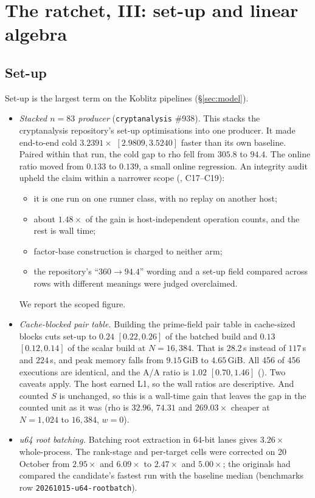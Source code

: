 \section{The ratchet, III: set-up and linear algebra}\label{sec:setup}

\subsection{Set-up}

Set-up is the largest term on the Koblitz pipelines (\S\ref{sec:model}).
\begin{itemize}
\item \emph{Stacked $n=83$ producer} (\texttt{cryptanalysis} \#938). This
  stacks the cryptanalysis repository's set-up optimisations into one
  producer. It made end-to-end cold $3.2391\times$ $[2.9809,3.5240]$
  faster than its own baseline. Paired within that run, the cold gap to
  rho fell from $305.8$ to $94.4$. The online ratio moved from $0.133$ to
  $0.139$, a small online regression. An integrity audit upheld the claim
  within a narrower scope (,
  C17--C19):
  \begin{itemize}
  \item it is one run on one runner class, with no replay on another host;
  \item about $1.48\times$ of the gain is host-independent operation
    counts, and the rest is wall time;
  \item factor-base construction is charged to neither arm;
  \item the repository's ``$360\to94.4$'' wording and a set-up field
    compared across rows with different meanings were judged
    overclaimed.
  \end{itemize}
  We report the scoped figure.
\item \emph{Cache-blocked pair table.} Building the prime-field pair table
  in cache-sized blocks cuts set-up to $0.24$ $[0.22,0.26]$ of the batched
  build and $0.13$ $[0.12,0.14]$ of the scalar build at $N=16{,}384$. That
  is $28.2$\,s instead of $117$\,s and $224$\,s, and peak memory falls from
  $9.15$\,GiB to $4.65$\,GiB. All 456 of 456 executions are identical, and
  the A/A ratio is $1.02$ $[0.70,1.46]$
  (). Two caveats apply.
  The host earned L1, so the wall ratios are descriptive. And counted $S$
  is unchanged, so this is a wall-time gain that leaves the gap in the
  counted unit as it was (rho is $32.96$, $74.31$ and $269.03\times$
  cheaper at $N=1{,}024$ to $16{,}384$, $w=0$).
\item \emph{u64 root batching.} Batching root extraction in 64-bit lanes
  gives $3.26\times$ whole-process. The rank-stage and per-target cells were
  corrected on 20 October from $2.95\times$ and $6.09\times$ to $2.47\times$
  and $5.00\times$; the originals had compared the candidate's fastest run
  with the baseline median (benchmarks row \texttt{20261015-u64-rootbatch}).
\end{itemize}

